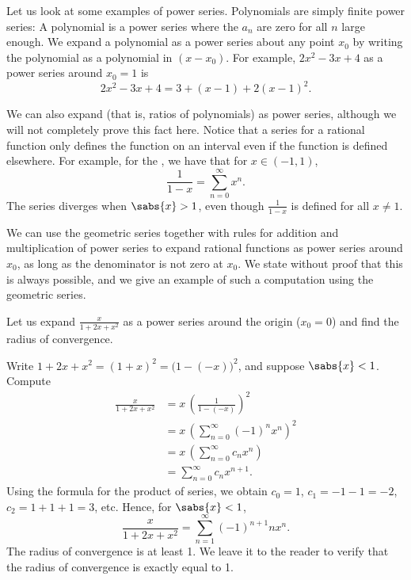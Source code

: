 Let us look at some examples of power series.
Polynomials are simply finite power series:  A polynomial
is a power series where
the $a_n$ are zero for all $n$ large enough.  We expand
a polynomial as a power series about any point $x_0$ by writing
the polynomial as a polynomial in $(x-x_0)$.  For example,
$2x^2-3x+4$ as a power series around $x_0 = 1$ is
\begin{equation*}
2x^2-3x+4 = 3 + (x-1) + 2{(x-1)}^2 .
\end{equation*}

We can also expand
\emph{} (that is, ratios of polynomials)
as power series, although we will not completely prove this fact here.
Notice that a series for a rational function only defines the function
on an interval even if the function is defined elsewhere.  For example, for
the \emph{}, we have that for
$x \in (-1,1)$,
\begin{equation*}
\frac{1}{1-x} =
\sum_{n=0}^\infty x^n .
\end{equation*}
The series diverges when $\sabs{x} > 1$, even though $\frac{1}{1-x}$ is
defined for all $x \not= 1$.

We can use the geometric series together with rules for addition and
multiplication of power series to expand rational functions as power
series around $x_0$,
as long as the denominator is not zero at $x_0$.  We state without
proof that this is always possible, and we give an example of such
a computation using the geometric series.

\begin{example}
Let us expand $\frac{x}{1+2x+x^2}$ as a power series around the origin ($x_0 = 0$) and
find the radius of convergence.

Write $1+2x+x^2 = {(1+x)}^2 = {\bigl(1-(-x)\bigr)}^2$, and suppose
$\sabs{x} < 1$.  Compute
\begin{equation*}
\begin{split}
\frac{x}{1+2x+x^2}
&=
x \,
{\left(
\frac{1}{1-(-x)}
\right)}^2
\\
&=
x \,
{\left( 
\sum_{n=0}^\infty {(-1)}^n x^n 
\right)}^2
\\
&=
x \,
\left(
\sum_{n=0}^\infty c_n x^n 
\right)
\\
&=
\sum_{n=0}^\infty c_n x^{n+1} .
\end{split}
\end{equation*}
Using the formula for the product of series,
we obtain $c_0 = 1$, $c_1 = -1 -1 = -2$, $c_2 = 1+1+1 = 3$, etc.
Hence, for $\sabs{x} < 1$, 
\begin{equation*}
\frac{x}{1+2x+x^2}
=
\sum_{n=1}^\infty {(-1)}^{n+1} n x^n .
\end{equation*}
The radius of convergence is at least 1.  We leave it to the reader to
verify that the radius of convergence is exactly equal to 1.
\end{example}

